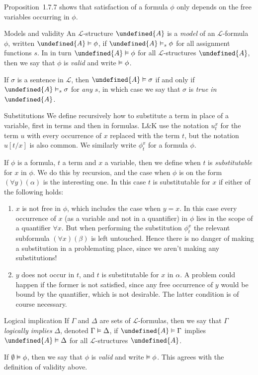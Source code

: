 \documentclass[article, a4paper, 11pt, oneside]{memoir}
\let\mathfrak\undefined
\numberwithin{equation}{chapter}
\newcommand{\calL}{\mathcal{L}}
\newcommand{\frakA}{\mathfrak{A}}
\theoremstyle{nonumberplain}
\begin{document}
\begin{notelist}
    Proposition~1.7.7 shows that satisfaction of a formula $\phi$ only depends on the free variables occurring in $\phi$.

    \item[Models and validity]
    An $\calL$-structure $\frakA$ is a \emph{model} of an $\calL$-formula $\phi$, written $\frakA \models \phi$, if $\frakA \sats{s} \phi$ for all assignment functions $s$. In in turn $\frakA \models \phi$ for all $\calL$-structures $\frakA$, then we say that $\phi$ is \emph{valid} and write $\vDash \phi$.

    If $\sigma$ is a sentence in $\calL$, then $\frakA \models \sigma$ if and only if $\frakA \sats{s} \sigma$ for \emph{any} $s$, in which case we say that $\sigma$ is \emph{true in $\frakA$}.

    \item[Substitutions]
    We define recursively how to substitute a term in place of a variable, first in terms and then in formulas. L\&K use the notation $u^x_t$ for the term $u$ with every occurrence of $x$ replaced with the term $t$, but the notation $u[t/x]$ is also common. We similarly write $\phi^x_t$ for a formula $\phi$. %

    If $\phi$ is a formula, $t$ a term and $x$ a variable, then we define when $t$ is \emph{substitutable} for $x$ in $\phi$. We do this by recursion, and the case when $\phi$ is on the form $(\forall y)(\alpha)$ is the interesting one. In this case $t$ is substitutable for $x$ if either of the following holds:
    \begin{enumerate}
        \item $x$ is not free in $\phi$, which includes the case when $y = x$. In this case every occurrence of $x$ (as a variable and not in a quantifier) in $\phi$ lies in the scope of a quantifier $\forall x$. But when performing the substitution $\phi^x_t$ the relevant subformula $(\forall x)(\beta)$ is left untouched. Hence there is no danger of making a substitution in a problemating place, since we aren't making any substitutions!

        \item $y$ does not occur in $t$, and $t$ is substitutable for $x$ in $\alpha$. A problem could happen if the former is not satisfied, since any free occurrence of $y$ would be bound by the quantifier, which is not desirable. The latter condition is of course necessary.
    \end{enumerate}

    \item[Logical implication]
    If $\Gamma$ and $\Delta$ are sets of $\calL$-formulas, then we say that $\Gamma$ \emph{logically implies} $\Delta$, denoted $\Gamma \vDash \Delta$, if $\frakA \models \Gamma$ implies $\frakA \models \Delta$ for all $\calL$-structures $\frakA$.

    If $\emptyset \vDash \phi$, then we say that $\phi$ is \emph{valid} and write $\vDash \phi$. This agrees with the definition of validity above.
\end{notelist}
\end{document}
